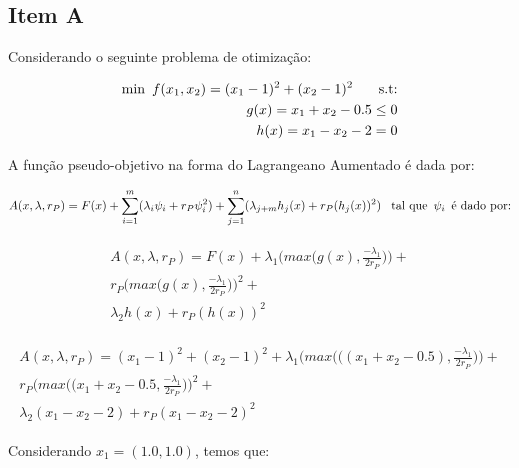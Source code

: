 \documentclass[a4paper, 12pt]{article}
\begin{document}
\subsection*{Item A}
Considerando o seguinte problema de otimização:

\begin{align*}
\begin{split}
\text{min\phantom{0}} f(x_1,x_2) = (x_1 - 1)^2 + (x_2 - 1)^2 \text{\phantom{000} s.t:} \\
g(x) = x_1 + x_2 - 0.5 \leq 0 \\
h(x) = x_1 - x_2 - 2 = 0
\end{split}
\end{align*}

A função pseudo-objetivo na forma do Lagrangeano Aumentado é dada por:

\begin{align*}
\begin{split}
A(x,\lambda, r_P) = F(x) + \sum_{i=1}^{m} (\lambda_i \psi_i + r_P \psi_i^2) + \sum_{j=1}^{n} (\lambda_{j+m} h_j(x) + r_P (h_j(x))^2) \text{\phantom{0} tal que\phantom{0}} \psi_i \text{\phantom{0}é dado por:} \\
\end{split}
\end{align*}

\begin{align*}
\begin{split}
A(x,\lambda, r_P) = F(x) + \lambda_1 \bigg ( max \bigg ( g(x), \frac{- \lambda_1}{2 r_P} \bigg ) \bigg ) + \\
r_P \bigg ( max \bigg ( g(x), \frac{- \lambda_1}{2 r_P} \bigg ) \bigg )^2 + \\
\lambda_2 h(x) + r_P (h(x))^2
\end{split}
\end{align*}

\begin{align*}
\begin{split}
A(x,\lambda, r_P) = (x_1 - 1)^2 + (x_2 - 1)^2 + \lambda_1 (max \bigg ( \bigg (  (x_1 + x_2 - 0.5), \frac{- \lambda_1}{2 r_P} \bigg ) \bigg ) + \\
r_P \bigg ( max \bigg ( (x_1 + x_2 - 0.5, \frac{- \lambda_1}{2 r_P} \bigg ) \bigg )^2 + \\
\lambda_2 (x_1 - x_2 - 2) + r_P (x_1 - x_2 - 2)^2
\end{split}
\end{align*}

Considerando $x_1 = (1.0, 1.0)$, temos que:
\end{document}
